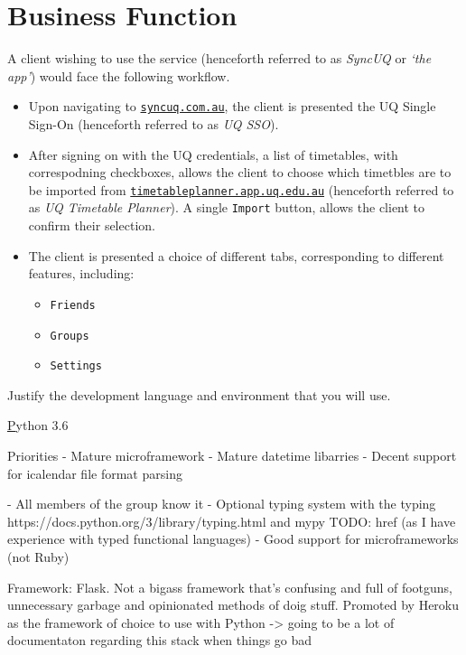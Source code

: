 \documentclass[11pt,a4paper]{report}
\begin{document}
\section{Business Function}

A client wishing to use the service (henceforth referred to as \textit{SyncUQ} or \textit{`the app'}) would face the following workflow.

\begin{itemize}
    \item Upon navigating to \href{http://www.syncuq.com.au/}{\texttt{syncuq.com.au}}, the client is presented the UQ Single Sign-On (henceforth referred to as \textit{UQ SSO}).
    \item After signing on with the UQ credentials, a list of timetables, with correspodning checkboxes, allows the client to choose which timetbles are to be imported from \href{http://timetableplanner.app.uq.edu.au/}{\texttt{timetableplanner.app.uq.edu.au}} (henceforth referred to as \textit{UQ Timetable Planner}). A single \texttt{Import} button, allows the client to confirm their selection.
    \item The client is presented a choice of different tabs, corresponding to different features, including: 
        \begin{itemize}
            \item \texttt{Friends}
            \item \texttt{Groups}
            \item \texttt{Settings}
        \end{itemize}



\end{itemize}


Justify the development language and environment that you will use.

\href{https://www.python.org/}Python 3.6


Priorities
- Mature microframework
- Mature datetime libarries
- Decent support for icalendar file format parsing


- All members of the group know it
- Optional typing system with the typing https://docs.python.org/3/library/typing.html and mypy TODO: href (as I have experience with typed functional languages)
- Good support for microframeworks (not Ruby)

Framework: Flask. Not a bigass framework that's confusing and full of footguns, unnecessary garbage and opinionated methods of doig stuff.
Promoted by Heroku as the framework of choice to use with Python -> going to be a lot of documentaton regarding this stack when things go bad
\end{document}
